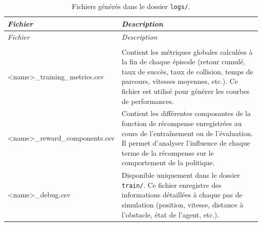 \begin{longtable}{
        >{\ttfamily\small}p{}
        p{}
    }
    \caption{Fichiers générés dans le dossier \texttt{logs/}.}
    \label{tab:log_files}                                                                                                                                                                                                                                                 \\

    \toprule
    \textnormal{\textit{Fichier}} &
    \textit{Description}                                                                                                                                                                                                                                                  \\
    \midrule
    \endfirsthead

    \toprule
    \textnormal{\textit{Fichier}} &
    \textit{Description}                                                                                                                                                                                                                                                  \\
    \midrule
    \endhead

    \midrule
    \\
    \endfoot

    \bottomrule
    \endlastfoot

    <name>\_training\_metrics.csv
                                  & Contient les métriques globales calculées à la fin de chaque épisode (retour cumulé, taux de succès, taux de collision, temps de parcours, vitesses moyennes, etc.). Ce fichier est utilisé pour générer les courbes de performances. \\

    <name>\_reward\_components.csv
                                  & Contient les différentes composantes de la fonction de récompense enregistrées au cours de l'entraînement ou de l'évaluation. Il permet d'analyser l'influence de chaque terme de la récompense sur le comportement de la politique.  \\

    <name>\_debug.csv
                                  & Disponible uniquement dans le dossier \texttt{train/}. Ce fichier enregistre des informations détaillées à chaque pas de simulation (position, vitesse, distance à l'obstacle, état de l'agent, etc.).                                \\
\end{longtable}

